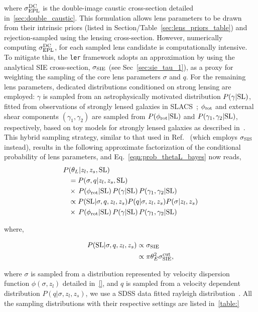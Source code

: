 \documentclass[aps,prd,twocolumn,superscriptaddress,groupedaddress,nofootinbib,showpacs,eqsecnum]{revtex4-1}
\begin{document}
where $\sigma^{{\rm DC}}_{{\rm EPL}}$ is the double-image caustic cross-section detailed in~\ref{sec:double_caustic}. 
This formulation allows lens parameters to be drawn from their intrinsic priors (listed in Section/Table~\ref{sec:lens_priors_table}) and rejection-sampled using the lensing cross-section. However, numerically computing $\sigma^{{\rm DC}}_{{\rm EPL}}$, for each sampled lens candidate is computationally intensive. 
To mitigate this, the \texttt{ler} framework adopts an approximation by using the analytical SIE cross-section, $\sigma_{{\rm SIE}}$ (see Sec~\ref{sec:sie_tau_1}), as a proxy for weighting the sampling of the core lens parameters $\sigma$ and $q$. For the remaining lens parameters, dedicated distributions conditioned on strong lensing are employed: $\gamma$ is sampled from an astrophysically motivated distribution $P(\gamma|{\rm SL})$, fitted from observations of strongly lensed galaxies in SLACS~\cite{Sonnenfeld2024}; $\phi_{{\rm rot}}$ and external shear components $(\gamma_1, \gamma_2)$ are sampled from $P(\phi_{{\rm rot}}|{\rm SL})$ and $P(\gamma_1, \gamma_2|{\rm SL})$, respectively, based on toy models for strongly lensed galaxies as described in~\cite{Collett2015,Wierda2021}. This hybrid sampling strategy, similar to that used in Ref.~\cite{Wierda2021} (which employs $\sigma_{{\rm SIS}}$ instead), results in the following approximate factorization of the conditional probability of lens parameters, and Eq.~\ref{eqn:prob_thetaL_bayes} now reads,
\begin{align}
P&(\theta_L| z_l, z_s, {\rm SL}) \notag\\
&= P(\sigma, q|z_l, z_s, {\rm SL}) \notag \\
&\times \, P(\phi_{\rm rot}|{\rm SL}) \, P(\gamma|{\rm SL}) \, P(\gamma_1, \gamma_2|{\rm SL})\\
&\propto P({\rm SL}|\sigma, q, z_l, z_s) P(q|\sigma, z_l, z_s) P(\sigma|z_l, z_s)\notag \\
&\times \, P(\phi_{\rm rot}|{\rm SL}) \, P(\gamma|{\rm SL}) \, P(\gamma_1, \gamma_2|{\rm SL})
\label{eqn:lensed_event_rate_z_5}
\end{align}

where,

\begin{align}
P({\rm SL}|\sigma, q, z_l, z_s) &\propto \sigma_{\rm SIE}\\
&\propto \pi \theta_E^2 \sigma^{\rm cut}_{\rm SIE},
\end{align}

where $\sigma$ is sampled from a distribution represented by velocity dispersion function $\phi(\sigma, z_l)$ detailed in~\ref{}, and $q$ is sampled from a velocity dependent distribution $P(q|\sigma, z_l, z_s)$, we use a SDSS data fitted rayleigh distribution~\cite{Collett2015}. All the sampling distributions with their respective settings are listed in~\ref{table:}
\end{document}
